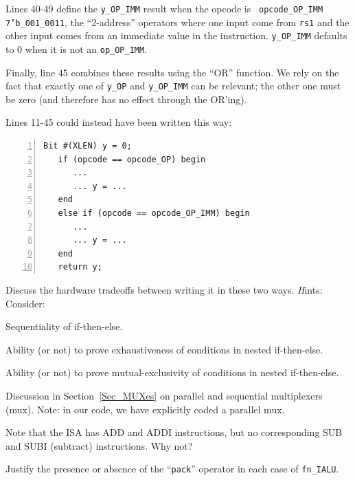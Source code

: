 Lines 40-49 define the \verb|y_OP_IMM| result when the opcode is {\tt
opcode\_OP\_IMM} {\ie} {\tt 7'b\_001\_0011}, {\ie} the ``2-address''
operators where one input come from {\tt rs1} and the other input
comes from an immediate value in the instruction.  \verb|y_OP_IMM|
defaults to 0 when it is not an \verb|op_OP_IMM|.

Finally, line 45 combines these results using the ``OR'' function.  We
rely on the fact that exactly one of \verb|y_OP| and \verb|y_OP_IMM|
can be relevant; the other one must be zero (and therefore has no
effect through the OR'ing).

\hdivider

\Exercise

Lines 11-45 could instead have been written this way:

{\small
\begin{Verbatim}[frame=single, numbers=left]
   Bit #(XLEN) y = 0;
   if (opcode == opcode_OP) begin
      ...
      ... y = ...
   end
   else if (opcode == opcode_OP_IMM) begin
      ...
      ... y = ...
   end
   return y;
\end{Verbatim}
}

Discuss the hardware tradeoffs between writing it in these two ways.
{\emph Hints:} Consider:

\begin{tightlist}

  \item Sequentiality of if-then-else.
  \item Ability (or not) to prove exhaustiveness of conditions in nested if-then-else.
  \item Ability (or not) to prove mutual-exclusivity of conditions in nested if-then-else.
  \item Discussion in Section~\ref{Sec_MUXes} on parallel and
    sequential multiplexers (mux).  Note: in our code, we have
    explicitly coded a parallel mux.

\end{tightlist}

\Exercise

Note that the ISA has ADD and ADDI instructions, but no corresponding
SUB and SUBI (subtract) instructions.  Why not?

\Exercise

Justify the presence or absence of the ``{\tt pack}'' operator in each
case of {\tt fn\_IALU}.

\Exercise

